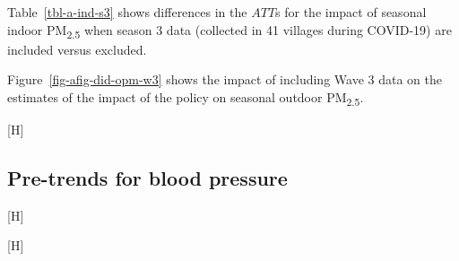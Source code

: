 \documentclass[
  letterpaper,
  DIV=11,
  numbers=noendperiod]{scrartcl}
\makeatletter
\renewenvironment{figure}%
   {\renewcommand\familydefault\sfdefault
    \@float{figure}}
   {\end@float}
\makeatother
\begin{document}
Table~\ref{tbl-a-ind-s3} shows differences in the \(ATT\)s for the
impact of seasonal indoor PM\textsubscript{2.5} when season 3 data
(collected in 41 villages during COVID-19) are included versus excluded.

Figure~\ref{fig-afig-did-opm-w3} shows the impact of including Wave 3
data on the estimates of the impact of the policy on seasonal outdoor
PM\textsubscript{2.5}.

\begin{figure}[H]

\caption{\label{fig-afig-did-opm-w3}Effects of the CBHP policy on
outdoor seasonal PM\textsubscript{2.5} based on whether Season 3 data
are included vs.~excluded.}


\end{figure}%

\newpage

\subsection{Pre-trends for blood
pressure}\label{pre-trends-for-blood-pressure}

\begin{figure}[H]

\caption{\label{fig-afig-pt3}Comparison of pre-interventions trends in
blood pressure between waves 1 and 2 for never treated and villages
later treated in wave 3}


\end{figure}%

\begin{figure}[H]

\caption{\label{fig-afig-pt4}Comparison of pre-interventions trends in
blood pressure between waves 1 and 2 for never treated and villages
later treated in wave 4}


\end{figure}%

\newpage

\newpage
\end{document}
